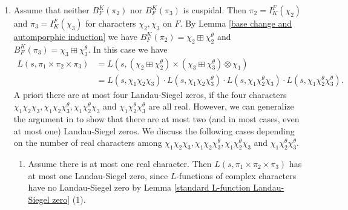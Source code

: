 \documentclass[12pt]{amsart}
\begin{document}
\begin{enumerate}
\begin{enumerate}
        \begin{align*}
            L(s,\pi_1 \times \pi_2 \times \pi_3) &= L(s,B_F^K(\pi_2) \times B_F^K(\pi_3) \otimes \chi_1) \\
            &= L(s,I_L^K(\xi_2) \times I_L^K(\xi_3)) \\
            &= L(s,\xi_3\xi_2) \cdot L(s,\xi_3\xi_2^{\theta_{L/K}}).
        \end{align*}
        Thus $L(s,\pi_1 \times \pi_2 \times \pi_3)$ has no Landau-Siegel zero unless $(\xi_3\xi_2)^2 = 1$ or $(\xi_3\xi_2^{\theta_{L/K}})^2 =1$. Moreover, there is at most one Landau-Siegel zero, by the same argument as in the proof of \cite[Theorem A]{RamakrishnanWang2003}. This proves Theorem \ref{Theorem A, refined version} (2).
    \end{enumerate}
    \item Assume that neither $B_F^K(\pi_2)$ nor $B_F^K(\pi_3)$ is cuspidal. Then $\pi_2 = I_K^F(\chi_2)$ and $\pi_3 = I_K^F(\chi_3)$ for characters $\chi_2,\chi_3$ on $F$. By Lemma \ref{base change and automporphic induction} we have $B_F^K(\pi_2) = \chi_2 \boxplus \chi_2^\theta$ and $B_F^K(\pi_3) = \chi_3 \boxplus \chi_3^\theta$. In this case we have 
    \begin{align*}
        L(s,\pi_1 \times \pi_2 \times \pi_3) &= L(s,(\chi_2 \boxplus \chi_2^\theta) \times (\chi_3 \boxplus \chi_3^\theta) \otimes \chi_1) \\
        &= L(s,\chi_1\chi_2\chi_3)\cdot L(s,\chi_1\chi_2\chi_3^\theta) \cdot L(s,\chi_1\chi_2^\theta\chi_3) \cdot L(s,\chi_1\chi_2^\theta\chi_3^\theta).
    \end{align*}
    A priori there are at most four Landau-Siegel zeros, if the four characters $\chi_1\chi_2\chi_3, \chi_1\chi_2\chi_3^\theta, \chi_1\chi_2^\theta\chi_3$ and $\chi_1\chi_2^\theta\chi_3^\theta$ are all real. However, we can generalize the argument in \cite[Section 4]{RamakrishnanWang2003} to show that there are at most two (and in most cases, even at most one) Landau-Siegel zeros. We discuss the following cases depending on the number of real characters among $\chi_1\chi_2\chi_3, \chi_1\chi_2\chi_3^\theta, \chi_1\chi_2^\theta\chi_3$ and $\chi_1\chi_2^\theta\chi_3^\theta$.
    \begin{enumerate}
        \item Assume there is at most one real character. Then $L(s,\pi_1 \times \pi_2 \times \pi_3)$ has at most one Landau-Siegel zero, since $L$-functions of complex characters have no Landau-Siegel zero by Lemma \ref{standard L-function Landau-Siegel zero} (1).

\end{enumerate}
\end{enumerate}
\end{document}

